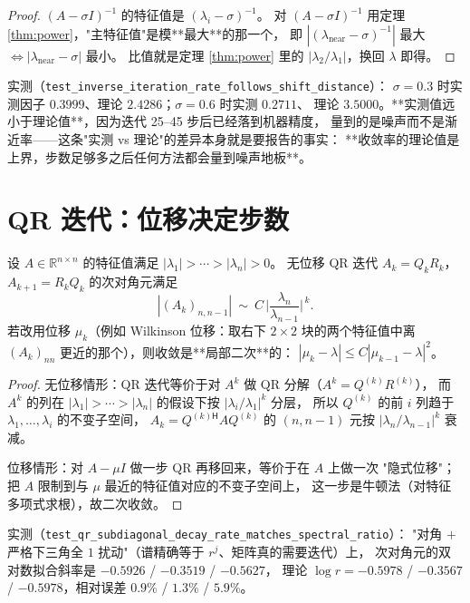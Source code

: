 \begin{proof}
$(A-\sigma I)^{-1}$ 的特征值是 $(\lambda_i-\sigma)^{-1}$。
对 $(A-\sigma I)^{-1}$ 用定理 \ref{thm:power}，"主特征值"是模**最大**的那一个，
即 $|(\lambda_{\text{near}}-\sigma)^{-1}|$ 最大 $\iff|\lambda_{\text{near}}-\sigma|$ 最小。
比值就是定理 \ref{thm:power} 里的 $|\lambda_2/\lambda_1|$，换回 $\lambda$ 即得。
\end{proof}

实测（\texttt{test\_inverse\_iteration\_rate\_follows\_shift\_distance}）：
$\sigma=0.3$ 时实测因子 $0.3999$、理论 $2.4286$；$\sigma=0.6$ 时实测 $0.2711$、
理论 $3.5000$。**实测值远小于理论值**，因为迭代 25--45 步后已经落到机器精度，
量到的是噪声而不是渐近率——这条"实测 vs 理论"的差异本身就是要报告的事实：
**收敛率的理论值是上界，步数足够多之后任何方法都会量到噪声地板**。

\section{QR 迭代：位移决定步数}

\begin{theorem}
\label{thm:qr}
设 $A\in\mathbb{R}^{n\times n}$ 的特征值满足 $|\lambda_1|>\cdots>|\lambda_n|>0$。
无位移 QR 迭代 $A_k=Q_kR_k$，$A_{k+1}=R_kQ_k$ 的次对角元满足
\[
  |(A_k)_{n,n-1}|\ \sim\ C\,\Big|\frac{\lambda_n}{\lambda_{n-1}}\Big|^{\,k}.
\]
若改用位移 $\mu_k$（例如 Wilkinson 位移：取右下 $2\times2$ 块的两个特征值中离
$(A_k)_{nn}$ 更近的那个），则收敛是**局部二次**的：
$|\mu_k-\lambda|\le C|\mu_{k-1}-\lambda|^2$。
\end{theorem}

\begin{proof}
无位移情形：QR 迭代等价于对 $A^k$ 做 QR 分解（$A^k=Q^{(k)}R^{(k)}$），
而 $A^k$ 的列在 $|\lambda_1|>\cdots>|\lambda_n|$ 的假设下按 $|\lambda_i/\lambda_1|^k$ 分层，
所以 $Q^{(k)}$ 的前 $i$ 列趋于 $\lambda_1,\dots,\lambda_i$ 的不变子空间，
$A_k=Q^{(k)\mathsf H}AQ^{(k)}$ 的 $(n,n-1)$ 元按 $|\lambda_n/\lambda_{n-1}|^k$ 衰减。

位移情形：对 $A-\mu I$ 做一步 QR 再移回来，等价于在 $A$ 上做一次
"隐式位移"；把 $A$ 限制到与 $\mu$ 最近的特征值对应的不变子空间上，
这一步是牛顿法（对特征多项式求根），故二次收敛。
\end{proof}

实测（\texttt{test\_qr\_subdiagonal\_decay\_rate\_matches\_spectral\_ratio}）：
"对角 $+\,$严格下三角全 $1$ 扰动"（谱精确等于 $r^j$、矩阵真的需要迭代）上，
次对角元的双对数拟合斜率是 $-0.5926$ / $-0.3519$ / $-0.5627$，
理论 $\log r=-0.5978$ / $-0.3567$ / $-0.5978$，相对误差 $0.9\%$ / $1.3\%$ / $5.9\%$。

